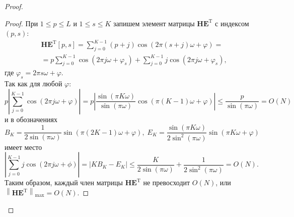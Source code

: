 \documentclass[specialist,
               substylefile = spbu_report.rtx,
               subf,href,colorlinks=true, 12pt]{disser}
\newcommand\norm[1]{\left\|#1\right\|}
\begin{document}
\begin{proof}
\begin{proof}
	При $1\leqslant p \leqslant L$ и $1 \leqslant s \leqslant K$ запишем элемент матрицы $\mathbf{HE}^\mathrm{T}$ с индексом $(p, s)$:
	\begin{align*}
		&\mathbf{HE}^\mathrm{T}[p,s]=\sum_{j=0}^{K-1}(p+j)\cos(2\pi (s+j)\omega + \varphi)=\\
		&=p\sum_{j=0}^{K-1}\cos(2\pi j\omega + \varphi_s)+\sum_{j=0}^{K-1}j\cos(2\pi j\omega + \varphi_s),
	\end{align*}
	где $\varphi_s = 2\pi s\omega + \varphi$.
	\\
	Так как для любой $\varphi$:
	\begin{equation*}
		p\left|\sum_{j=0}^{K-1}\cos(2\pi j\omega + \varphi)\right| = p\left|\dfrac{\sin(\pi K\omega)}{\sin(\pi \omega)}\cos(\pi(K-1)\omega + \varphi)\right| \leqslant \dfrac{p}{\sin(\pi\omega)}=O(N)
	\end{equation*}
	и в обозначениях
	\begin{equation*}
		B_K = \dfrac{1}{2\sin(\pi\omega)}\sin(\pi(2K-1)\omega + \varphi),\; E_K = \dfrac{\sin(\pi K \omega)}{2\sin^2(\pi \omega)}\sin(\pi K\omega + \varphi)
	\end{equation*}
	имеет место
	\begin{equation*}
		\left|\sum_{j=0}^{K-1}j\cos(2\pi j\omega + \phi)\right|=\left|KB_K-E_K\right|\leqslant\dfrac{K}{2\sin(\pi\omega)} + \dfrac{1}{2\sin^2(\pi\omega)}=O(N).
	\end{equation*}
	Таким образом, каждый член матрицы $\mathbf{HE}^\mathrm{T}$ не превосходит $O(N)$, или $\norm{\mathbf{HE}^\mathrm{T}}_{\max}=O(N)$.
\end{proof}



\end{proof}
\end{document}
